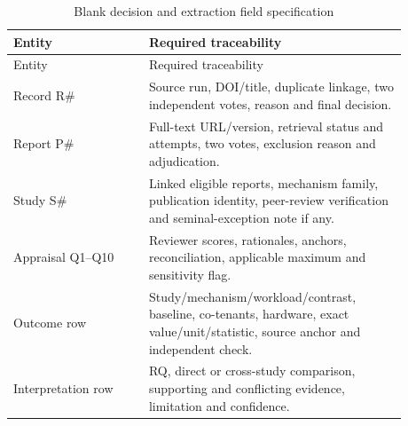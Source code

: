 \documentclass[12pt,a4paper]{article}
\begin{document}
\begin{longtable}{p{0.30\linewidth}p{0.58\linewidth}}
\caption{Blank decision and extraction field specification}\\\toprule Entity & Required traceability\\\midrule\endfirsthead\toprule Entity & Required traceability\\\midrule\endhead
Record R\# & Source run, DOI/title, duplicate linkage, two independent votes, reason and final decision.\\
Report P\# & Full-text URL/version, retrieval status and attempts, two votes, exclusion reason and adjudication.\\
Study S\# & Linked eligible reports, mechanism family, publication identity, peer-review verification and seminal-exception note if any.\\
Appraisal Q1--Q10 & Reviewer scores, rationales, anchors, reconciliation, applicable maximum and sensitivity flag.\\
Outcome row & Study/mechanism/workload/contrast, baseline, co-tenants, hardware, exact value/unit/statistic, source anchor and independent check.\\
Interpretation row & RQ, direct or cross-study comparison, supporting and conflicting evidence, limitation and confidence.\\\bottomrule
\end{longtable}

\clearpage


\end{document}

